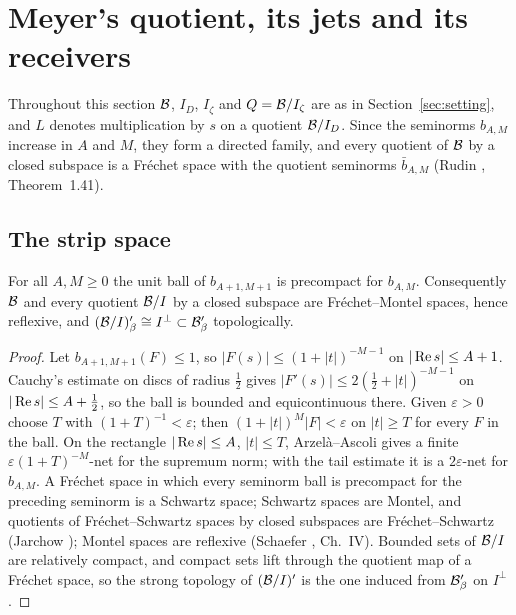 \section{Meyer's quotient, its jets and its receivers}\label{sec:quotient}

Throughout this section $\mathcal{B}$, $I_D$, $I_\zeta$ and $Q=\mathcal{B}/I_\zeta$ are as in Section~\ref{sec:setting}, and $L$ denotes multiplication by $s$ on a quotient $\mathcal{B}/I_D$.
Since the seminorms $b_{A,M}$ increase in $A$ and $M$, they form a directed family, and every quotient of $\mathcal{B}$ by a closed subspace is a Fréchet space with the quotient seminorms $\bar b_{A,M}$ (Rudin \cite{Rudin}, Theorem~1.41).

\subsection{The strip space}

\begin{lemma}\label{lem:schwartz}
For all $A,M\ge0$ the unit ball of $b_{A+1,M+1}$ is precompact for $b_{A,M}$.
Consequently $\mathcal{B}$ and every quotient $\mathcal{B}/I$ by a closed subspace are Fréchet--Montel spaces, hence reflexive, and $(\mathcal{B}/I)'_\beta\cong I^\perp\subset\mathcal{B}'_\beta$ topologically.
\end{lemma}

\begin{proof}
Let $b_{A+1,M+1}(F)\le1$, so $|F(s)|\le(1+|t|)^{-M-1}$ on $|\operatorname{Re} s|\le A+1$.
Cauchy's estimate on discs of radius $\tfrac12$ gives $|F'(s)|\le2(\tfrac12+|t|)^{-M-1}$ on $|\operatorname{Re} s|\le A+\tfrac12$, so the ball is bounded and equicontinuous there.
Given $\varepsilon>0$ choose $T$ with $(1+T)^{-1}<\varepsilon$; then $(1+|t|)^M|F|<\varepsilon$ on $|t|\ge T$ for every $F$ in the ball.
On the rectangle $|\operatorname{Re} s|\le A$, $|t|\le T$, Arzelà--Ascoli gives a finite $\varepsilon(1+T)^{-M}$-net for the supremum norm; with the tail estimate it is a $2\varepsilon$-net for $b_{A,M}$.
A Fréchet space in which every seminorm ball is precompact for the preceding seminorm is a Schwartz space; Schwartz spaces are Montel, and quotients of Fréchet--Schwartz spaces by closed subspaces are Fréchet--Schwartz (Jarchow \cite{Jarchow}); Montel spaces are reflexive (Schaefer \cite{Schaefer}, Ch.~IV).
Bounded sets of $\mathcal{B}/I$ are relatively compact, and compact sets lift through the quotient map of a Fréchet space, so the strong topology of $(\mathcal{B}/I)'$ is the one induced from $\mathcal{B}'_\beta$ on $I^\perp$.
\end{proof}

